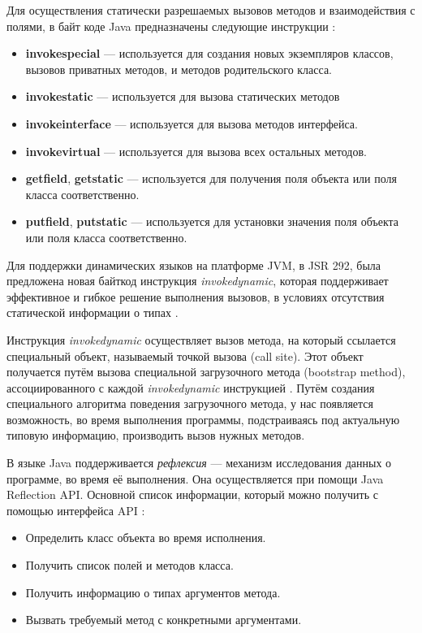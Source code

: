Для осуществления статически разрешаемых вызовов методов и взаимодействия с полями, в байт коде Java предназначены следующие инструкции \cite{book:yellin1996java}:

\begin{itemize}
    \item \textbf{invokespecial} --- используется для создания новых экземпляров классов, вызовов приватных методов, и методов родительского класса.
    \item \textbf{invokestatic} --- используется для вызова статических методов
    \item \textbf{invokeinterface} --- используется для вызова методов интерфейса.
    \item \textbf{invokevirtual} --- используется для вызова всех остальных методов.
    \item \textbf{getfield}, \textbf{getstatic} --- используется для получения поля объекта или поля класса соответственно.
    \item \textbf{putfield}, \textbf{putstatic} --- используется для установки значения поля объекта или поля класса соответственно.
\end{itemize}


Для поддержки динамических языков на платформе JVM, в JSR 292, была предложена новая байткод инструкция \textit{invokedynamic}, которая поддерживает эффективное и гибкое решение выполнения вызовов, в условиях отсутствия статической информации о типах \cite{java:JSR292rosejsr}.

Инструкция \textit{invokedynamic} осуществляет вызов метода, на который ссылается специальный объект, называемый точкой вызова (call site). Этот объект получается путём вызова специальной загрузочного метода (bootstrap method), ассоциированного с каждой \textit{invokedynamic} инструкцией \cite{book:yellin1996java}. Путём создания специального алгоритма поведения загрузочного метода, у нас появляется возможность, во время выполнения программы, подстраиваясь под актуальную типовую информацию, производить вызов нужных методов.


В языке Java поддерживается \textit{рефлексия} --- механизм исследования данных о программе, во время её выполнения. Она осуществляется при помощи Java Reflection API. Основной список информации, который можно получить с помощью интерфейса API \cite{java:forman2004javaReflectionsInAction}:

\begin{itemize}
    \item Определить класс объекта во время исполнения.
    \item Получить список полей и методов класса.
    \item Получить информацию о типах аргументов метода.
    \item Вызвать требуемый метод с конкретными аргументами.
\end{itemize}

